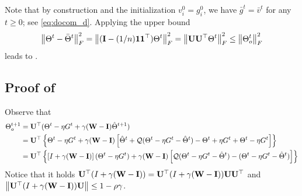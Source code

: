 \documentclass[10pt]{article} %
\theoremstyle{plain}
\theoremstyle{definition}
\theoremstyle{remark}
\newcommand{\Prm}{\Theta}
\newcommand{\avgg}{\bar{g}}
\newcommand{\avgTheta}{\bar{\Prm}}
\newcommand{\norm}[1]{\left\| #1 \right\|}
\newcommand{\avgone}{\frac{1}{n}\mathbf{1}\mathbf{1}^\top}
\newcommand{\nl}{\nonumber\\}
\newcommand{\W}{{\bf W}}
\newcommand{\U}{{\bf U}}
\newcommand{\I}{{\bf I}}
\newcommand{\avgv}{\bar{v}}
\begin{document}
Note that by construction and the initialization $v_i^0 = g_i^0$, we have $\avgg^t = \avgv^t$ for any $t\ge0$; see \eqref{eq:docom_d}. Applying the upper bound 
\begin{align}
\norm{\Theta^t - \avgTheta^t}_F^2 = \norm{ ( \I - (1/n) {\bf 1}{\bf 1}^\top) \Theta^t }_F^2 = \norm{ \U \U^\top \Theta^t }_F^2 \leq \norm{\Theta^t_o}_F^2
\end{align}
leads to . 

\subsection{Proof of }\label{app:theta_o_new}
Observe that
\begin{align}
    \Theta^{t+1}_o &= {\bf U}^\top(\Theta^t - \eta G^t + \gamma ( \W - \I) \hat{\Theta}^{t+1}) \nonumber\\
    &= {\bf U}^\top\left\{\Theta^t - \eta G^t + \gamma ( \W - \I)\left[\hat{\Theta}^t + {\cal Q} (\Theta^t - \eta G^t - \hat{\Theta}^t ) -\Theta^t + \eta G^t + \Theta^t - \eta G^t\right]\right\} \nonumber\\
    &= {\bf U}^\top\left\{\left[I + \gamma (\W-\I)\right](\Theta^t - \eta G^t) + \gamma(\W-\I)\left[ {\cal Q} (\Theta^t - \eta G^t - \hat{\Theta}^t ) - (\Theta^t - \eta G^t - \hat{\Theta}^t)\right] \right\} \label{eq:sub1}
\end{align}
Notice that it holds $\U^\top ( I + \gamma ( \W - \I ) ) = {\bf U}^\top ( I + \gamma(\W-\I) ) \U \U^\top$ and $\norm{\U^\top(I + \gamma (\W-\I)) \U} \leq 1 - \rho \gamma$. 
\end{document}
